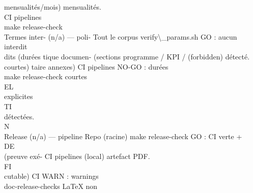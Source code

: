 \documentclass[12pt,landscape,a4paper]{article}
\begin{document}
mensualités/mois)    mensualités.\\
CI pipelines\\
make release-check\\
Termes inter-   (n/a) — poli-    Tout le corpus                verify\textbackslash{}_params.sh    GO : aucun interdit\\
dits (durées    tique documen-   (sections programme / KPI /   (forbidden)         détecté.\\
courtes)        taire            annexes)                      CI pipelines        NO-GO : durées\\
make release-check courtes\\
\vspace{0.5em}
\vspace{0.5em}
\vspace{0.5em}
\vspace{0.5em}
EL\\
explicites\\
\vspace{0.5em}
\vspace{0.5em}
\vspace{0.5em}
\vspace{0.5em}
TI\\
détectées.\\
\vspace{0.5em}
\vspace{0.5em}
\vspace{0.5em}
\vspace{0.5em}
N\\
Release          (n/a) — pipeline Repo (racine)                 make release-check GO : CI verte +\\
\vspace{0.5em}
\vspace{0.5em}
\vspace{0.5em}
\vspace{0.5em}
DE\\
(preuve exé-                      CI pipelines                  (local)             artefact PDF.\\
\vspace{0.5em}
\vspace{0.5em}
\vspace{0.5em}
\vspace{0.5em}
FI\\
cutable)                                                        CI                  WARN : warnings\\
doc-release-checks LaTeX non\\
\end{document}
